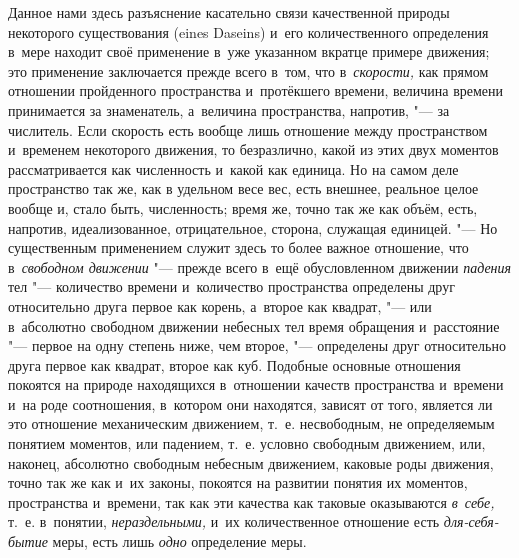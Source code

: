 Данное нами здесь разъяснение касательно связи качественной природы некоторого
существования (eines Daseins) и~его количественного определения в~мере находит
своё применение в~уже указанном вкратце примере движения; это применение
заключается прежде всего в~том, что в~{\em скорости,} как прямом отношении
пройденного пространства и~протёкшего времени, величина времени принимается за
знаменатель, а~величина пространства, напротив, "--- за числитель. Если
скорость есть вообще лишь отношение между пространством и~временем некоторого
движения, то безразлично, какой из этих двух моментов рассматривается как
численность и~какой как единица. Но на самом деле пространство так же, как в
удельном весе вес, есть внешнее, реальное целое вообще и, стало быть,
численность; время же, точно так же как объём, есть, напротив, идеализованное,
отрицательное, сторона, служащая единицей. "--- Но существенным применением
служит здесь то более важное отношение, что в~{\em свободном движении} "---
прежде всего в~ещё обусловленном движении {\em падения} тел "--- количество
времени и~количество пространства определены друг относительно друга первое как
корень, а~второе как квадрат, "--- или в~абсолютно свободном движении небесных
тел время обращения и~расстояние "--- первое на одну степень ниже, чем второе,
"--- определены друг относительно друга первое как квадрат, второе как куб.
Подобные основные отношения покоятся на природе находящихся в~отношении качеств
пространства и~времени и~на роде соотношения, в~котором они находятся, зависят
от того, является ли это отношение механическим движением, т.~е. несвободным,
не определяемым понятием моментов, или падением, т.~е. условно свободным
движением, или, наконец, абсолютно свободным небесным движением, каковые роды
движения, точно так же как и~их законы, покоятся на развитии понятия их
моментов, пространства и~времени, так как эти качества как таковые оказываются
{\em в~себе,} т.~е. в~понятии, {\em нераздельными,} и~их количественное
отношение есть {\em для-себя-бытие} меры, есть лишь {\em одно} определение
меры.

